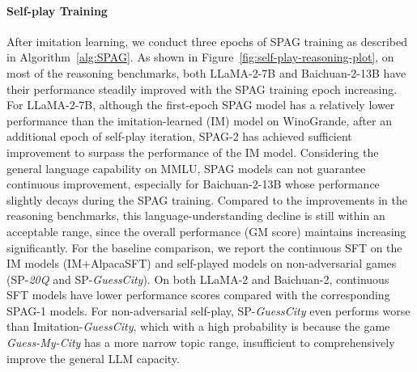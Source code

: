 \documentclass{article}
\theoremstyle{plain}
\theoremstyle{definition}
\theoremstyle{remark}
\begin{document}
\paragraph{Self-play Training} After imitation learning, we conduct three epochs of SPAG training as described in Algorithm~\ref{alg:SPAG}. As shown in Figure~\ref{fig:self-play-reasoning-plot}, on most of the reasoning benchmarks, both LLaMA-2-7B and Baichuan-2-13B have their performance steadily improved with the SPAG training epoch increasing. For LLaMA-2-7B,  although the first-epoch SPAG model has a relatively lower performance than the imitation-learned (IM) model on WinoGrande, after an additional epoch of self-play iteration, SPAG-2 has achieved sufficient improvement to surpass the performance of the IM model. Considering the general language capability on MMLU, SPAG models can not guarantee continuous improvement, especially for Baichuan-2-13B whose performance slightly decays during the SPAG training. Compared to the improvements in the reasoning benchmarks, this language-understanding decline is still within an acceptable range, since the overall performance (GM score) maintains increasing significantly. For the baseline comparison, we report the continuous SFT on the IM models (IM+AlpacaSFT) and self-played models on non-adversarial games (SP-\textit{20Q} and SP-\textit{GuessCity}). On both LLaMA-2 and Baichuan-2, continuous SFT models have lower performance scores compared with the corresponding SPAG-1 models. For non-adversarial self-play, SP-\textit{GuessCity} even performs worse than Imitation-\textit{GuessCity}, which with a high probability is because the game \textit{Guess-My-City} has a more narrow topic range, insufficient to comprehensively improve the general LLM capacity.


\end{document}

